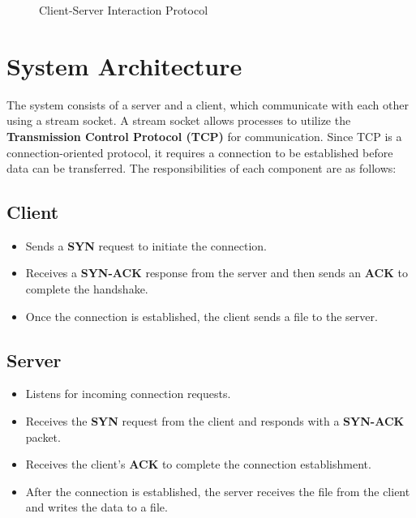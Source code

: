 \documentclass{article}
\begin{document}
\begin{figure}[h]
    \caption{Client-Server Interaction Protocol}
\end{figure}

\clearpage
\section{System Architecture}

The system consists of a server and a client, which communicate with each other using a stream socket. A stream socket allows processes to utilize the \textbf{Transmission Control Protocol (TCP)} for communication. Since TCP is a connection-oriented protocol, it requires a connection to be established before data can be transferred. The responsibilities of each component are as follows:

\subsection*{Client}
\begin{itemize}
    \item Sends a \textbf{SYN} request to initiate the connection.
    \item Receives a \textbf{SYN-ACK} response from the server and then sends an \textbf{ACK} to complete the handshake.
    \item Once the connection is established, the client sends a file to the server.
\end{itemize}

\subsection*{Server}
\begin{itemize}
    \item Listens for incoming connection requests.
    \item Receives the \textbf{SYN} request from the client and responds with a \textbf{SYN-ACK} packet.
    \item Receives the client's \textbf{ACK} to complete the connection establishment.
    \item After the connection is established, the server receives the file from the client and writes the data to a file.
\end{itemize}
\end{document}
